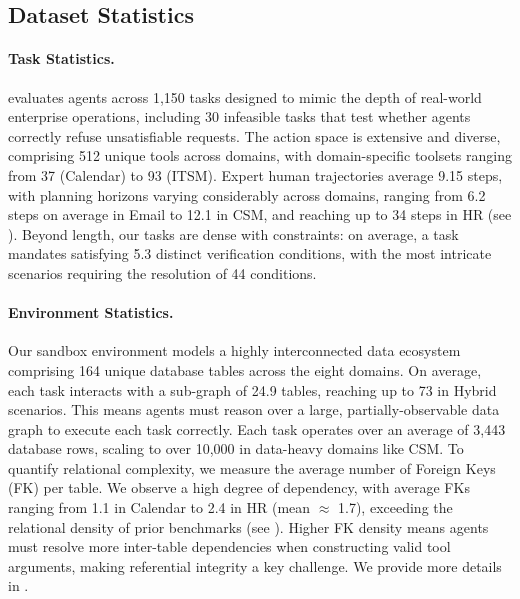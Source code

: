 \subsection{Dataset Statistics} \label{subsec:statistics}

\paragraph{Task Statistics.}
\dataset evaluates agents across 1,150 tasks designed to mimic the depth of real-world enterprise operations, including 30 infeasible tasks that test whether agents correctly refuse unsatisfiable requests. The action space is extensive and diverse, comprising 512 unique tools across domains, with domain-specific toolsets ranging from 37 (Calendar) to 93 (ITSM). Expert human trajectories average 9.15 steps, with planning horizons varying considerably across domains, ranging from 6.2 steps on average in Email to 12.1 in CSM, and reaching up to 34 steps in HR (see ). Beyond length, our tasks are dense with constraints: on average, a task mandates satisfying 5.3 distinct verification conditions, with the most intricate scenarios requiring the resolution of 44 conditions.

\paragraph{Environment Statistics.}
Our sandbox environment models a highly interconnected data ecosystem comprising 164 unique database tables across the eight domains. On average, each task interacts with a sub-graph of 24.9 tables, reaching up to 73 in Hybrid scenarios. This means agents must reason over a large, partially-observable data graph to execute each task correctly. Each task operates over an average of 3,443 database rows, scaling to over 10,000 in data-heavy domains like CSM. To quantify relational complexity, we measure the average number of Foreign Keys (FK) per table. We observe a high degree of dependency, with average FKs ranging from 1.1 in Calendar to 2.4 in HR (mean $\approx$ 1.7), exceeding the relational density of prior benchmarks (see ). Higher FK density means agents must resolve more inter-table dependencies when constructing valid tool arguments, making referential integrity a key challenge. We provide more details in .